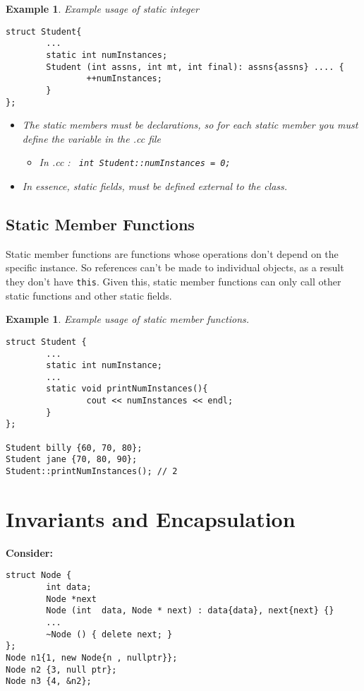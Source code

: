 \documentclass{article}
\newtheorem{ex}[theorem]{Example}
\begin{document}
\begin{ex} Example usage of static integer
\begin{lstlisting}
struct Student{
		...
		static int numInstances; 
		Student (int assns, int mt, int final): assns{assns} .... {
				++numInstances;
		}
};
\end{lstlisting}
\begin{itemize}
\item The static members must be declarations, so for each static member you must define the variable in the .cc file 
\begin{itemize}
\item In .cc : \verb| int Student::numInstances = 0;|
\end{itemize}
\item In essence, static fields, must be defined external to the class. 
\end{itemize}
\end{ex}

\subsection{Static Member Functions}
Static member functions are functions whose operations don't depend on the specific instance. So references can't be made to individual objects, as a result they don't have \verb|this|. 
Given this, static member functions can only call other static functions and other static fields. 

\begin{ex} Example usage of static member functions. 
\begin{lstlisting}
struct Student {
		...
		static int numInstance;
		...
		static void printNumInstances(){
				cout << numInstances << endl;
		}
};

Student billy {60, 70, 80};
Student jane {70, 80, 90};
Student::printNumInstances(); // 2
\end{lstlisting}
\end{ex}

\section{Invariants and Encapsulation}
\textbf{Consider:}
\begin{lstlisting}
struct Node {
		int data;
		Node *next 
		Node (int  data, Node * next) : data{data}, next{next} {}
		...
		~Node () { delete next; }
};
Node n1{1, new Node{n , nullptr}};
Node n2 {3, null ptr};
Node n3 {4, &n2}; 
\end{lstlisting}
\end{document}
